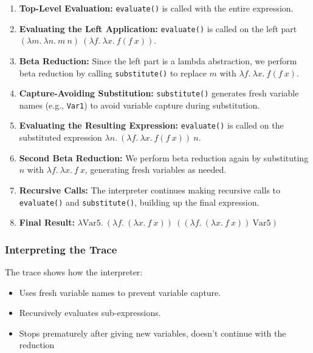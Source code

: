 \documentclass{article}
\begin{document}
\begin{enumerate}
    \item \textbf{Top-Level Evaluation:} \texttt{evaluate()} is called with the entire expression.

    \item \textbf{Evaluating the Left Application:} \texttt{evaluate()} is called on the left part \((\lambda m.\ \lambda n.\ m\ n)\ (\lambda f.\ \lambda x.\ f(f\ x))\).

    \item \textbf{Beta Reduction:} Since the left part is a lambda abstraction, we perform beta reduction by calling \texttt{substitute()} to replace \(m\) with \(\lambda f.\ \lambda x.\ f(f\ x)\).

    \item \textbf{Capture-Avoiding Substitution:} \texttt{substitute()} generates fresh variable names (e.g., \texttt{Var1}) to avoid variable capture during substitution.

    \item \textbf{Evaluating the Resulting Expression:} \texttt{evaluate()} is called on the substituted expression \(\lambda n.\ (\lambda f.\ \lambda x.\ f(f\ x))\ n\).

    \item \textbf{Second Beta Reduction:} We perform beta reduction again by substituting \(n\) with \(\lambda f.\ \lambda x.\ f\ x\), generating fresh variables as needed.

    \item \textbf{Recursive Calls:} The interpreter continues making recursive calls to \texttt{evaluate()} and \texttt{substitute()}, building up the final expression.

    \item \textbf{Final Result:} \(\lambda \text{Var5}.\ (\lambda f.\ (\lambda x.\ f\ x))\ ((\lambda f.\ (\lambda x.\ f\ x))\ \text{Var5})\)


\end{enumerate}

\subsubsection*{Interpreting the Trace}

The trace shows how the interpreter:

\begin{itemize}
    \item Uses fresh variable names to prevent variable capture.
    \item Recursively evaluates sub-expressions.
    \item Stops prematurely after giving new variables, doesn't continue with the reduction
\end{itemize}
\end{document}

